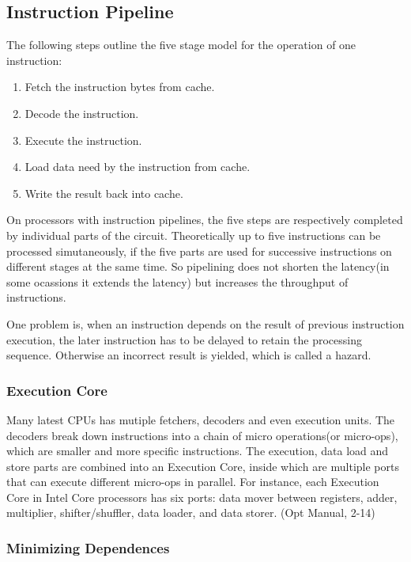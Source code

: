 \documentclass[a4paper]{report}
\begin{document}
\subsection{Instruction Pipeline} \indent

	The following steps outline the five stage model for the operation of one instruction:
	
	\begin{enumerate}
		\item Fetch the instruction bytes from cache.
		\item Decode the instruction.
		\item Execute the instruction.
		\item Load data need by the instruction from cache.
		\item Write the result back into cache.
	\end{enumerate}

	On processors with instruction pipelines, the five steps are respectively completed by individual parts of the circuit. Theoretically up to five instructions can be processed simutaneously, if the five parts are used for successive instructions on different stages at the same time. So pipelining does not shorten the latency(in some ocassions it extends the latency) but increases the throughput of instructions.


	One problem is, when an instruction depends on the result of previous instruction execution, the later instruction has to be delayed to retain the processing sequence. Otherwise an incorrect result is yielded, which is called a hazard.

\subsubsection{Execution Core} \indent

	Many latest CPUs has mutiple fetchers, decoders and even execution units. The decoders break down instructions into a chain of micro operations(or micro-ops), which are smaller and more specific instructions. The execution, data load and store parts are combined into an Execution Core, inside which are multiple ports that can execute different micro-ops in parallel. For instance, each Execution Core in Intel Core processors has six ports: data mover between registers, adder, multiplier, shifter/shuffler, data loader, and data storer. (Opt Manual, 2-14)

\subsubsection{Minimizing Dependences} \indent
\end{document}
